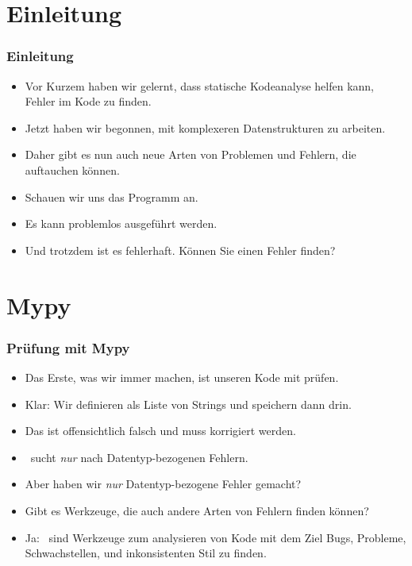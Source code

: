 \documentclass[aspectratio=169,mathserif,notheorems]{beamer}%
\subtitle{18.~Zwischenspiel:~Der Linter Ruff}%
\begin{document}
%
%
\startPresentation%
%
\section{Einleitung}%
\begin{frame}[t]%
\frametitle{Einleitung}%
%
%
%
\begin{itemize}%
%
\item Vor Kurzem haben wir gelernt, dass statische Kodeanalyse helfen kann, Fehler im Kode zu finden.%
%
\item<2-> Jetzt haben wir begonnen, mit komplexeren Datenstrukturen zu arbeiten.%
%
\item<3-> Daher gibt es nun auch neue Arten von Problemen und Fehlern, die auftauchen können.%
%
\item<4-> Schauen wir uns das Programm  an.%
%
\item<5-> Es kann problemlos ausgeführt werden.%
%
\item<6-> Und trotzdem ist es fehlerhaft. Können Sie einen Fehler finden?%
%
\end{itemize}%
%
%
\end{frame}%
%
\section{Mypy}%
%
\begin{frame}[b]%
\frametitle{Prüfung mit Mypy}%
%
%
\begin{itemize}%
\item Das Erste, was wir immer machen, ist unseren Kode mit \mypy\cite{LLHSVRZSJYYMC2024MOSTFP} prüfen.%
\item<2-> Klar: Wir definieren  als Liste von Strings und speichern dann  drin.%
\item<3-> Das ist offensichtlich falsch und muss korrigiert werden.%
\item<4-> \mypy\ sucht \emph{nur} nach Datentyp-bezogenen Fehlern.%
\item<5-> Aber haben wir \emph{nur} Datentyp-bezogene Fehler gemacht?%
\item<6-> Gibt es Werkzeuge, die auch andere Arten von Fehlern finden können?%
\item<7-> \alert{Ja}:~ sind Werkzeuge zum analysieren von Kode mit dem Ziel Bugs, Probleme, Schwachstellen, und inkonsistenten Stil zu finden\cite{J1978LACPC,RJYKK2022CULTDVM}.
\end{itemize}%
%
%
\end{frame}%
%
\end{document}
